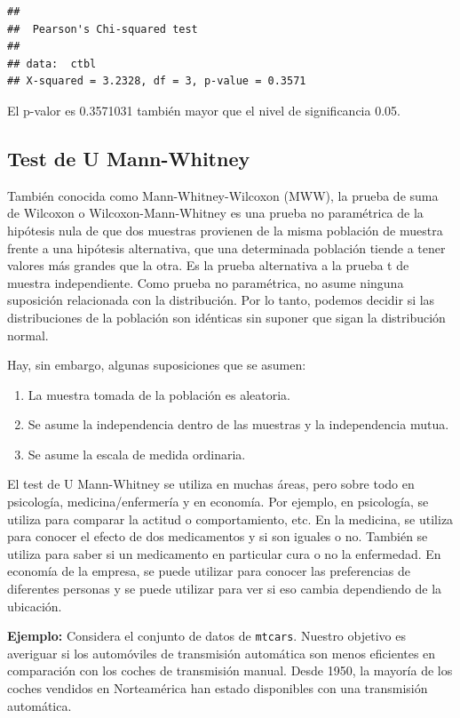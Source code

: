 \documentclass[]{article}
\def\tightlist{}
\numberwithin{equation}{section}
\begin{document}
\begin{verbatim}
## 
##  Pearson's Chi-squared test
## 
## data:  ctbl
## X-squared = 3.2328, df = 3, p-value = 0.3571
\end{verbatim}

El p-valor es 0.3571031 también mayor que el nivel de significancia
0.05.

\subsection{Test de U Mann-Whitney}\label{test-de-u-mann-whitney}

También conocida como Mann-Whitney-Wilcoxon (MWW), la prueba de suma de
Wilcoxon o Wilcoxon-Mann-Whitney es una prueba no paramétrica de la
hipótesis nula de que dos muestras provienen de la misma población de
muestra frente a una hipótesis alternativa, que una determinada
población tiende a tener valores más grandes que la otra. Es la prueba
alternativa a la prueba t de muestra independiente. Como prueba no
paramétrica, no asume ninguna suposición relacionada con la
distribución. Por lo tanto, podemos decidir si las distribuciones de la
población son idénticas sin suponer que sigan la distribución normal.

Hay, sin embargo, algunas suposiciones que se asumen:

\begin{enumerate}
\def\labelenumi{\arabic{enumi}.}
\tightlist
\item
  La muestra tomada de la población es aleatoria.
\item
  Se asume la independencia dentro de las muestras y la independencia
  mutua.
\item
  Se asume la escala de medida ordinaria.
\end{enumerate}

El test de U Mann-Whitney se utiliza en muchas áreas, pero sobre todo en
psicología, medicina/enfermería y en economía. Por ejemplo, en
psicología, se utiliza para comparar la actitud o comportamiento, etc.
En la medicina, se utiliza para conocer el efecto de dos medicamentos y
si son iguales o no. También se utiliza para saber si un medicamento en
particular cura o no la enfermedad. En economía de la empresa, se puede
utilizar para conocer las preferencias de diferentes personas y se puede
utilizar para ver si eso cambia dependiendo de la ubicación.

\textbf{Ejemplo:} Considera el conjunto de datos de \texttt{mtcars}.
Nuestro objetivo es averiguar si los automóviles de transmisión
automática son menos eficientes en comparación con los coches de
transmisión manual. Desde 1950, la mayoría de los coches vendidos en
Norteamérica han estado disponibles con una transmisión automática.
\end{document}
